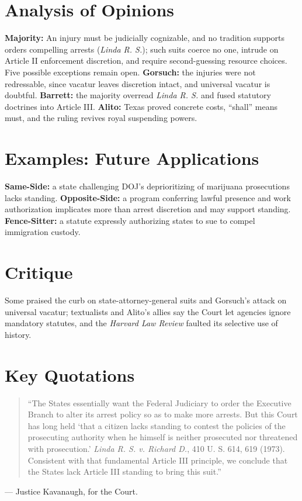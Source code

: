 \documentclass[12pt]{article}
\begin{document}
\section{Analysis of Opinions}
\textbf{Majority:} An injury must be judicially cognizable, and no tradition supports orders compelling arrests (\textit{Linda R. S.}); such suits coerce no one, intrude on Article II enforcement discretion, and require second-guessing resource choices. Five possible exceptions remain open. \textbf{Gorsuch:} the injuries were not redressable, since vacatur leaves discretion intact, and universal vacatur is doubtful. \textbf{Barrett:} the majority overread \textit{Linda R. S.} and fused statutory doctrines into Article III. \textbf{Alito:} Texas proved concrete costs, ``shall'' means must, and the ruling revives royal suspending powers.

\section{Examples: Future Applications}
\textbf{Same-Side:} a state challenging DOJ's deprioritizing of marijuana prosecutions lacks standing. \textbf{Opposite-Side:} a program conferring lawful presence and work authorization implicates more than arrest discretion and may support standing. \textbf{Fence-Sitter:} a statute expressly authorizing states to sue to compel immigration custody.

\section{Critique}
Some praised the curb on state-attorney-general suits and Gorsuch's attack on universal vacatur; textualists and Alito's allies say the Court let agencies ignore mandatory statutes, and the \textit{Harvard Law Review} faulted its selective use of history.

\section{Key Quotations}
\begin{quote}
``The States essentially want the Federal Judiciary to order the Executive Branch to alter its arrest policy so as to make more arrests. But this Court has long held `that a citizen lacks standing to contest the policies of the prosecuting authority when he himself is neither prosecuted nor threatened with prosecution.' \textit{Linda R. S. v. Richard D.}, 410 U. S. 614, 619 (1973). Consistent with that fundamental Article III principle, we conclude that the States lack Article III standing to bring this suit.''
\end{quote}
\noindent --- Justice Kavanaugh, for the Court.
\end{document}
